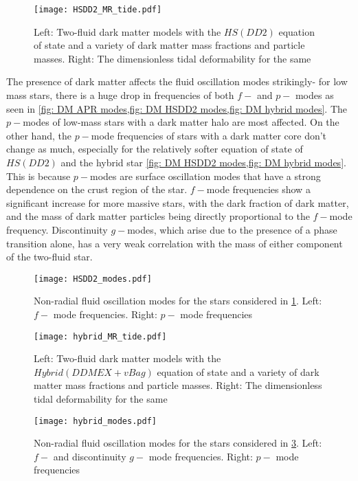 \documentclass[a4paper,12pt,onehalfspacing]{report}
\begin{document}
\begin{figure}[ht]
    \centering
    \texttt{[image: HSDD2\_MR\_tide.pdf]}
    \caption{Left: Two-fluid dark matter models with the $HS(DD2)$ equation of state and a variety of dark matter mass fractions and particle masses. Right: The dimensionless tidal deformability for the same}
    \label{fig: DM HSDD2 MR tide}
\end{figure}

The presence of dark matter affects the fluid oscillation modes strikingly- for low mass stars, there is a huge drop in frequencies of both $f-$ and $p-$ modes as seen in \cref{fig: DM APR modes,fig: DM HSDD2 modes,fig: DM hybrid modes}. The $p-$modes of low-mass stars with a dark matter halo are most affected. On the other hand, the $p-$mode frequencies of stars with a dark matter core don't change as much, especially for the relatively softer equation of state of $HS(DD2)$ and the hybrid star \cref{fig: DM HSDD2 modes,fig: DM hybrid modes}. This is because $p-$modes are surface oscillation modes that have a strong dependence on the crust region of the star. $f-$mode frequencies show a significant increase for more massive stars, with the dark fraction of dark matter, and the mass of dark matter particles being directly proportional to the $f-$mode frequency. Discontinuity $g-$modes, which arise due to the presence of a phase transition alone, has a very weak correlation with the mass of either component of the two-fluid star. 

\begin{figure}[ht]
    \centering
    \texttt{[image: HSDD2\_modes.pdf]}
    \caption{Non-radial fluid oscillation modes for the stars considered in \cref{fig: DM HSDD2 MR tide}. Left: $f-$ mode frequencies. Right: $p-$ mode frequencies}
    \label{fig: DM HSDD2 modes}
\end{figure}

\begin{figure}[ht]
    \centering
    \texttt{[image: hybrid\_MR\_tide.pdf]}
    \caption{Left: Two-fluid dark matter models with the $Hybrid (DDMEX+vBag)$ equation of state and a variety of dark matter mass fractions and particle masses. Right: The dimensionless tidal deformability for the same}
    \label{fig: DM hybrid MR tide}
\end{figure}

\begin{figure}[ht]
    \centering
    \texttt{[image: hybrid\_modes.pdf]}
    \caption{Non-radial fluid oscillation modes for the stars considered in \cref{fig: DM hybrid MR tide}. Left: $f-$ and discontinuity $g-$ mode frequencies. Right: $p-$ mode frequencies}
    \label{fig: DM hybrid modes}
\end{figure}
\end{document}
